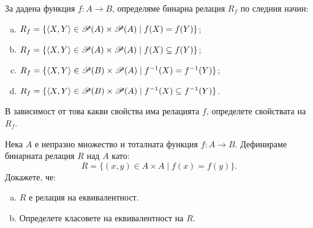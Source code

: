 \begin{problem}
  За дадена функция $f:A \to B$, определяме бинарна релация $R_f$ по следния начин:
  \begin{enumerate}[a)]
  \item
    $R_f = \{\langle{X,Y}\rangle \in \mathscr{P}(A) \times \mathscr{P}(A) \mid f(X) = f(Y)\}$;
  \item
    $R_f = \{\langle{X,Y}\rangle \in \mathscr{P}(A) \times \mathscr{P}(A) \mid f(X) \subseteq f(Y)\}$;
  \item
    $R_f = \{\langle{X,Y}\rangle \in \mathscr{P}(B) \times \mathscr{P}(A) \mid f^{-1}(X) = f^{-1}(Y)\}$;
  \item
    $R_f = \{\langle{X,Y}\rangle \in \mathscr{P}(B) \times \mathscr{P}(A) \mid f^{-1}(X) \subseteq f^{-1}(Y)\}$.
  \end{enumerate}
  В зависимост от това какви свойства има релацията $f$, определете свойствата на $R_f$.
\end{problem}

\begin{problem}
  Нека $A$ е непразно множество и тоталната функция $f:A \to B$.
  Дефинираме бинарната релация $R$ над $A$ като:
  \[R = \{(x,y) \in A\times A\mid f(x) = f(y)\}.\]
  Докажете, че:
  \begin{enumerate}[a)]
  \item
    $R$ е релация на еквивалентност.
  \item
    Определете класовете на еквивалентност на $R$.
\end{enumerate}
\end{problem}

